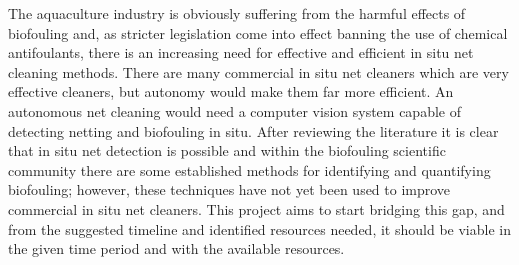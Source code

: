 \documentclass[11.5pt, twoside, a4paper]{article}
\begin{document}
The aquaculture industry is obviously suffering from the harmful effects of biofouling and, as stricter legislation come into effect banning the use of chemical antifoulants, there is an increasing need for effective and efficient in situ net cleaning methods. There are many commercial in situ net cleaners which are very effective cleaners, but autonomy would make them far more efficient. An autonomous net cleaning would need a computer vision system capable of detecting netting and biofouling in situ. After reviewing the literature it is clear that in situ net detection is possible and within the biofouling scientific community there are some established methods for identifying and quantifying biofouling; however, these techniques have not yet been used to improve commercial in situ net cleaners. This project aims to start bridging this gap, and from the suggested timeline and identified resources needed, it should be viable in the given time period and with the available resources.


{}
\end{document}
